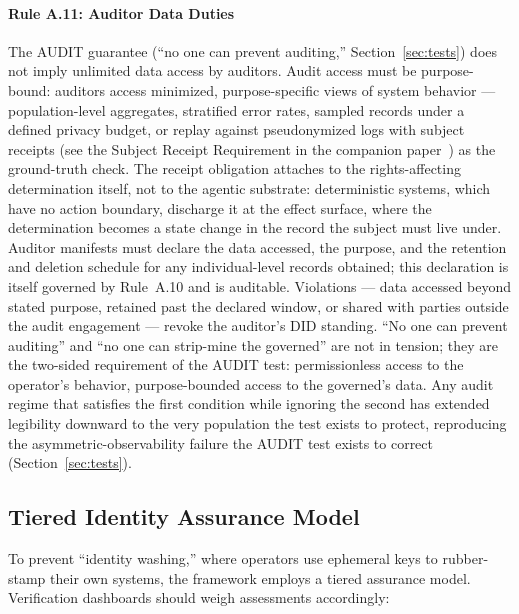\documentclass{article}
\begin{document}
\paragraph{Rule A.11: Auditor Data Duties}
The AUDIT guarantee (``no one can prevent auditing,'' Section~\ref{sec:tests}) does not imply unlimited data access by auditors. Audit access must be purpose-bound: auditors access minimized, purpose-specific views of system behavior --- population-level aggregates, stratified error rates, sampled records under a defined privacy budget, or replay against pseudonymized logs with subject receipts (see the Subject Receipt Requirement in the companion paper~\citep{aravind2026epi}) as the ground-truth check. The receipt obligation attaches to the rights-affecting determination itself, not to the agentic substrate: deterministic systems, which have no action boundary, discharge it at the effect surface, where the determination becomes a state change in the record the subject must live under. Auditor manifests must declare the data accessed, the purpose, and the retention and deletion schedule for any individual-level records obtained; this declaration is itself governed by Rule~A.10 and is auditable. Violations --- data accessed beyond stated purpose, retained past the declared window, or shared with parties outside the audit engagement --- revoke the auditor's DID standing. ``No one can prevent auditing'' and ``no one can strip-mine the governed'' are not in tension; they are the two-sided requirement of the AUDIT test: permissionless access to the operator's behavior, purpose-bounded access to the governed's data. Any audit regime that satisfies the first condition while ignoring the second has extended legibility downward to the very population the test exists to protect, reproducing the asymmetric-observability failure the AUDIT test exists to correct (Section~\ref{sec:tests}).

\subsection{Tiered Identity Assurance Model}

To prevent ``identity washing,'' where operators use ephemeral keys to rubber-stamp their own systems, the framework employs a tiered assurance model. Verification dashboards should weigh assessments accordingly:
\end{document}
